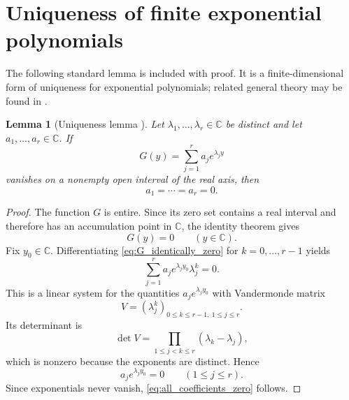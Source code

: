 \documentclass[11pt]{amsart}
\numberwithin{equation}{section}
\theoremstyle{plain}
\newtheorem{lemma}[theorem]{Lemma}
\theoremstyle{definition}
\theoremstyle{remark}
\begin{document}
\section{Uniqueness of finite exponential polynomials}
\label{sec:uniqueness}

The following standard lemma is included with proof.  It is a finite-dimensional form of uniqueness for exponential polynomials; related general theory may be found in \cite{Boas1954}.

\begin{lemma}[Uniqueness lemma {}]
\label{lem:exponential_uniqueness}
Let $\lambda_1,\ldots,\lambda_r\in\mathbb C$ be distinct and let $a_1,\ldots,a_r\in\mathbb C$.  If
\begin{equation}
G(y)=\sum_{j=1}^{r}a_je^{\lambda_jy}
\label{eq:G_exponential_polynomial}
\end{equation}
vanishes on a nonempty open interval of the real axis, then
\begin{equation}
a_1=\cdots=a_r=0.
\label{eq:all_coefficients_zero}
\end{equation}
\end{lemma}

\begin{proof}
The function $G$ is entire.  Since its zero set contains a real interval and therefore has an accumulation point in $\mathbb C$, the identity theorem gives
\begin{equation}
G(y)=0
\qquad(y\in\mathbb C).
\label{eq:G_identically_zero}
\end{equation}
Fix $y_0\in\mathbb C$.  Differentiating \eqref{eq:G_identically_zero} for $k=0,\ldots,r-1$ yields
\begin{equation}
\sum_{j=1}^{r}
a_je^{\lambda_jy_0}\lambda_j^k=0.
\label{eq:derivative_system}
\end{equation}
This is a linear system for the quantities $a_je^{\lambda_jy_0}$ with Vandermonde matrix
\begin{equation}
V=(\lambda_j^{k})_{0\leq k\leq r-1,\ 1\leq j\leq r}.
\label{eq:vandermonde_matrix}
\end{equation}
Its determinant is
\begin{equation}
\det V
=
\prod_{1\leq j<k\leq r}(\lambda_k-\lambda_j),
\label{eq:vandermonde_determinant}
\end{equation}
which is nonzero because the exponents are distinct.  Hence
\begin{equation}
a_je^{\lambda_jy_0}=0
\qquad(1\leq j\leq r).
\label{eq:weighted_coefficients_zero}
\end{equation}
Since exponentials never vanish, \eqref{eq:all_coefficients_zero} follows.
\end{proof}
\end{document}
